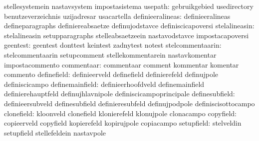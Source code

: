                                   stellesystemein                  nastavsystem
                                  impostasistema
                         usepath: gebruikgebied                    usedirectory
                                  benutzeverzeichnis               uzijadresar %
                                  usacartella                      %
                definieeralineas: definieeralineas                 defineparagraphs
                                  definiereabsaetze                definujodstavce
                                  definiscicapoversi
                   stelalineasin: stelalineasin                    setupparagraphs
                                  stelleabsaetzeein                nastavodstavce
                                  impostacapoversi
                        geentest: geentest                         donttest
                                  keintest                         zadnytest
                                  notest
                stelcommentaarin: stelcommentaarin                 setupcomment
                                  stellekommentarein               nastavkomentar
                                  impostacommento
                      commentaar: commentaar                       comment
                                  kommentar                        komentar
                                  commento
                     definefield: definieerveld                    definefield
                                  definierefeld                    definujpole
                                  definiscicampo
                 definemainfield: definieerhoofdveld               definemainfield
                                  definierehauptfeld               definujhlavnipole
                                  definiscicampoprincipale
                  definesubfield: definieersubveld                 definesubfield
                                  definieresubfeld                 definujpodpole
                                  definiscisottocampo
                      clonefield: kloonveld                        clonefield
                                  klonierefeld                     klonujpole
                                  clonacampo
                       copyfield: copieerveld                      copyfield
                                  kopierefeld                      kopirujpole
                                  copiacampo
                      setupfield: stelveldin                       setupfield
                                  stellefeldein                    nastavpole
